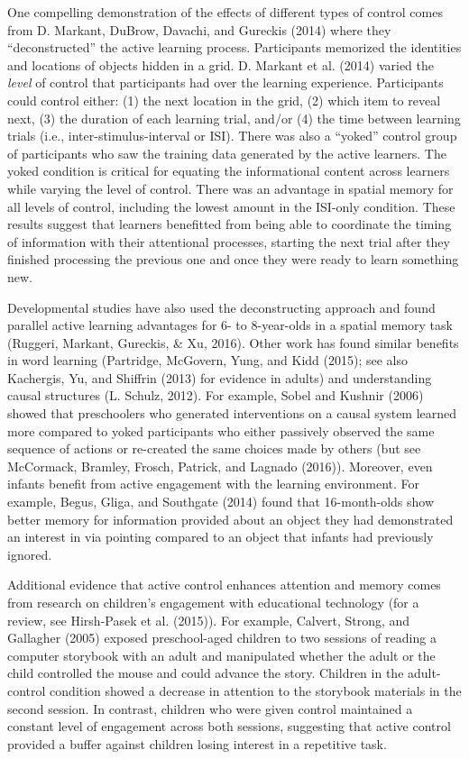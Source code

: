 \documentclass[english,floatsintext,man]{apa6}
\theoremstyle{definition}
\theoremstyle{definition}
\theoremstyle{definition}
\theoremstyle{remark}
\begin{document}
One compelling demonstration of the effects of different types of
control comes from D. Markant, DuBrow, Davachi, and Gureckis (2014)
where they \enquote{deconstructed} the active learning process.
Participants memorized the identities and locations of objects hidden in
a grid. D. Markant et al. (2014) varied the \emph{level} of control that
participants had over the learning experience. Participants could
control either: (1) the next location in the grid, (2) which item to
reveal next, (3) the duration of each learning trial, and/or (4) the
time between learning trials (i.e., inter-stimulus-interval or ISI).
There was also a \enquote{yoked} control group of participants who saw
the training data generated by the active learners. The yoked condition
is critical for equating the informational content across learners while
varying the level of control. There was an advantage in spatial memory
for all levels of control, including the lowest amount in the ISI-only
condition. These results suggest that learners benefitted from being
able to coordinate the timing of information with their attentional
processes, starting the next trial after they finished processing the
previous one and once they were ready to learn something new.

Developmental studies have also used the deconstructing approach and
found parallel active learning advantages for 6- to 8-year-olds in a
spatial memory task (Ruggeri, Markant, Gureckis, \& Xu, 2016). Other
work has found similar benefits in word learning (Partridge, McGovern,
Yung, and Kidd (2015); see also Kachergis, Yu, and Shiffrin (2013) for
evidence in adults) and understanding causal structures (L. Schulz,
2012). For example, Sobel and Kushnir (2006) showed that preschoolers
who generated interventions on a causal system learned more compared to
yoked participants who either passively observed the same sequence of
actions or re-created the same choices made by others (but see
McCormack, Bramley, Frosch, Patrick, and Lagnado (2016)). Moreover, even
infants benefit from active engagement with the learning environment.
For example, Begus, Gliga, and Southgate (2014) found that 16-month-olds
show better memory for information provided about an object they had
demonstrated an interest in via pointing compared to an object that
infants had previously ignored.

Additional evidence that active control enhances attention and memory
comes from research on children's engagement with educational technology
(for a review, see Hirsh-Pasek et al. (2015)). For example, Calvert,
Strong, and Gallagher (2005) exposed preschool-aged children to two
sessions of reading a computer storybook with an adult and manipulated
whether the adult or the child controlled the mouse and could advance
the story. Children in the adult-control condition showed a decrease in
attention to the storybook materials in the second session. In contrast,
children who were given control maintained a constant level of
engagement across both sessions, suggesting that active control provided
a buffer against children losing interest in a repetitive task.
\end{document}
